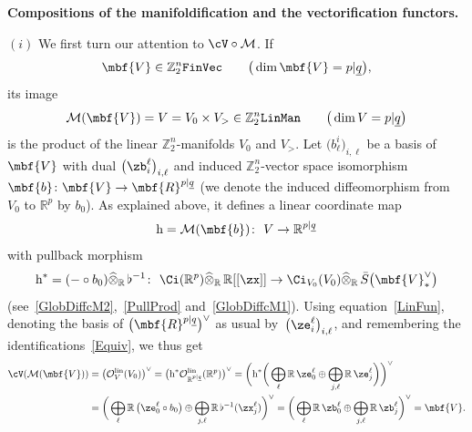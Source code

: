 \documentclass[pdftex]{sigma}%
\newcommand{\rmh}{\textnormal{h}}
\newcommand{\op}[1]{\operatorname{#1}}
\newcommand{\R}{{\mathbb R}}
\newcommand{\Z}{{\mathbb Z}}
\def\ul{\underline}
\def\cM{\cal M}
\def\cO{\mathcal{O}}
\def\cM{\mathcal{M}}
\def\ul{\underline}
\newcommand{\0}{\otimes}
\newcommand{\z}{\Z_2^n}
\numberwithin{equation}{section}
\begin{document}
\medskip\noindent
{\bf Compositions of the manifoldification and the vectorification functors.}

\smallskip
$(i)$ We first turn our attention to $\cV\circ\cM$. If
\[
\mbf{V}\in\z{\tt FinVec}\qquad\big(\op{dim}\mbf{V}=p|\ul q\big),
\]
its image
\[
\cM(\mbf{V})=V=V_0\times V_>\in\z{\tt LinMan}\qquad\big(\op{dim}V=p|\ul q\big)
\]
is the product of the linear $\z$-manifolds $V_0$ and $V_>$. Let $\big(b^i_\ell\big)_{i,\ell}$ be a basis of $\mbf{V}$ with dual $\big(\zb_i^\ell\big)_{i,\ell}$ and induced $\z$-vector space isomorphism $\mbf{b}\colon \mbf{V}\to\mbf{R}^{p|\ul q}$ (we denote the induced diffeomorphism from $V_0$ to $\R^p$ by $b_0$). As explained above, it defines a linear coordinate map
\begin{gather}\label{LinCooMapFroBas}
\rmh=\cM(\mbf{b})\colon\ V\to\R^{p|\ul q}
\end{gather}
with pullback morphism
\[
\rmh^*=(-\circ b_0)\widehat{\0}_\R\,\flat^{-1}\colon\ \Ci(\R^p)\widehat{\0}_\R\,\R[[\zx]]\to \Ci_{V_0}(V_0)\widehat{\0}_\R\,\bar S\big(\mbf{V}^\vee_*\big)
\]
(see~\eqref{GlobDiffcM2},~\eqref{PullProd} and~\eqref{GlobDiffcM1}). Using equation~\eqref{LinFun}, denoting the basis of $\big(\mbf{R}^{p|\ul q}\big)^\vee$ as usual by~$\big(\ze_i^\ell\big)_{i,\ell}$, and remembering the identifications~\eqref{Equiv}, we thus get
\begin{align*}
\cV(\cM(\mbf{V}))&=\big(\cO_V^{\op{lin}}(V_0)\big)^\vee=\big(\rmh^*\cO_{\R^{p|\ul q}}^{\op{lin}}(\R^p)\big)^\vee=\bigg(\rmh^*\bigg(\bigoplus_\ell\R\,\ze^\ell_0\oplus\bigoplus_{j,\ell} \R\,\ze^\ell_j\bigg)\bigg)^\vee
\\
&=\bigg(\bigoplus_\ell\R\,\big(\ze^\ell_0\circ b_0\big)\oplus\bigoplus_{j,\ell}\R\,\flat^{-1}(\zx^\ell_j)\bigg)^\vee =\bigg(\bigoplus_\ell\R\,\zb^\ell_0\oplus\bigoplus_{j,\ell}\R\,\zb^\ell_j\bigg)^\vee=\mbf{V}.
\end{align*}
\end{document}
